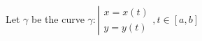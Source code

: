 {\begin{frame}
\begin{columns}[c]
\begin{center}
\end{center}
%
\end{columns}
\end{frame}



\begin{frame}
Let $\gamma $ be the curve 
$ \gamma: \left|
\begin{array}{rcl} 
x=x(t)\\
y=y(t)
\end{array}, t\in [a,b]
\right.$


\end{frame}}
